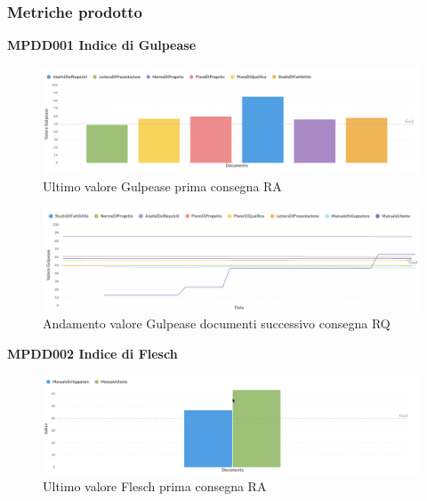 \documentclass[PianoDiQualifica.tex]{subfiles}
\begin{document}
\subsubsection{Metriche prodotto}
\textbf{MPDD001 Indice di Gulpease}
\begin{figure}[H]
	\centering
	\includegraphics[width=1\linewidth]{RQ/gulpease}
	\caption{Ultimo valore Gulpease prima consegna RA}
	\label{fig:processi}
\end{figure}
\begin{figure}[H]
	\centering
	\includegraphics[width=1\linewidth]{RQ/gulpeasegrid}
	\caption{Andamento valore Gulpease documenti successivo consegna RQ}
	\label{fig:processi}
\end{figure}
\textbf{MPDD002 Indice di Flesch}
\begin{figure}[H]
	\centering
	\includegraphics[width=1\linewidth]{RQ/flesch}
	\caption{Ultimo valore Flesch prima consegna RA}
	\label{fig:processi}
\end{figure}

\end{document}
